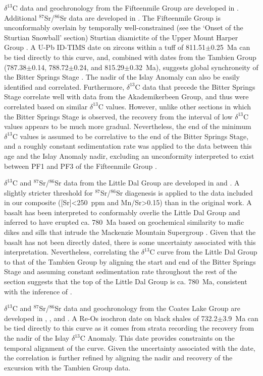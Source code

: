 \documentclass[11pt,letterpaper]{article}
\newcommand{\dC}{$\delta^{13}$C\xspace}
\newcommand{\SrSr}{$^{87}$Sr/$^{86}$Sr\xspace}
\begin{document}
\dC data and geochronology from the Fifteenmile Group are developed in \citet{Macdonald2010a}. Additional \SrSr data are developed in \citet{Cox2016a}. The Fifteenmile Group is unconformably overlain by temporally well-constrained (see the `Onset of the Sturtian Snowball' section) Sturtian diamictite of the Upper Mount Harper Group \citep{Macdonald2010a}. A U-Pb ID-TIMS date on zircons within a tuff of 811.51$\pm$0.25~Ma can be tied directly to this curve, and, combined with dates from the Tambien Group (787.38$\pm$0.14, 788.72$\pm$0.24, and 815.29$\pm$0.32~Ma), suggests global synchroneity of the Bitter Springs Stage \citep{Swanson-Hysell2015a}. The nadir of the Islay Anomaly can also be easily identified and correlated. Furthermore, \dC data that precede the Bitter Springs Stage correlate well with data from the Akademikerbeen Group, and thus were correlated based on similar \dC values. However, unlike other sections in which the Bitter Springs Stage is observed, the recovery from the interval of low \dC values appears to be much more gradual. Nevertheless, the end of the minimum \dC values is assumed to be correlative to the end of the Bitter Springs Stage, and a roughly constant sedimentation rate was applied to the data between this age and the Islay Anomaly nadir, excluding an unconformity interpreted to exist between PF1 and PF3 of the Fifteenmile Group \citep{Macdonald2010a}.

\dC and \SrSr data from the Little Dal Group are developed in \citet{Halverson2006a} and \citet{Halverson2007b}. A slightly stricter threshold for \SrSr diagenesis is applied to the data included in our composite ([Sr]\textless250~ppm and Mn/Sr\textgreater0.15) than in the original work. A basalt has been interpreted to conformably overlie the Little Dal Group \citep{Aitken1981a} and inferred to have erupted ca. 780~Ma based on geochemical similarity to mafic dikes and sills that intrude the Mackenzie Mountain Supergroup \citep{Harlan2003a}. Given that the basalt has not been directly dated, there is some uncertainty associated with this interpretation. Nevertheless, correlating the \dC curve from the Little Dal Group to that of the Tambien Group by aligning the start and end of the Bitter Springs Stage and assuming constant sedimentation rate throughout the rest of the section suggests that the top of the Little Dal Group is ca. 780~Ma, consistent with the inference of \citet{Harlan2003a}.

\dC and \SrSr data and geochronology from the Coates Lake Group are developed in \citet{Halverson2006a}, \citet{Halverson2007b}, and \citet{Rooney2014a}. A Re-Os isochron date on black shales of 732.2$\pm$3.9~Ma can be tied directly to this curve as it comes from strata recording the recovery from the nadir of the Islay \dC Anomaly. This date provides constraints on the temporal alignment of the curve. Given the uncertainty associated with the date, the correlation is further refined by aligning the nadir and recovery of the excursion with the Tambien Group data.
\end{document}

